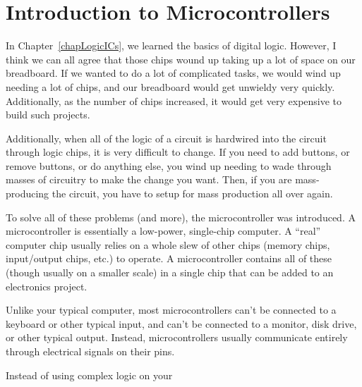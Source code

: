 \chapter{Introduction to Microcontrollers}

In Chapter~\ref{chapLogicICs}, we learned the basics of digital logic.
However, I think we can all agree that those chips wound up taking up a lot of space on our breadboard.
If we wanted to do a lot of complicated tasks, we would wind up needing a lot of chips, and our breadboard would get unwieldy very quickly.
Additionally, as the number of chips increased, it would get very expensive to build such projects.

Additionally, when all of the logic of a circuit is hardwired into the circuit through logic chips, it is very difficult to change.
If you need to add buttons, or remove buttons, or do anything else, you wind up needing to wade through masses of circuitry to make the change you want.
Then, if you are mass-producing the circuit, you have to setup for mass production all over again.

To solve all of these problems (and more), the microcontroller was introduced.
A microcontroller is essentially a low-power, single-chip computer.
A ``real'' computer chip usually relies on a whole slew of other chips (memory chips, input/output chips, etc.) to operate.
A microcontroller contains all of these (though usually on a smaller scale) in a single chip that can be added to an electronics project.

Unlike your typical computer, most microcontrollers can't be connected to a keyboard or other typical input, and can't be connected to a monitor, disk drive, or other typical output.
Instead, microcontrollers usually communicate entirely through electrical signals on their pins.

Instead of using complex logic on your 


